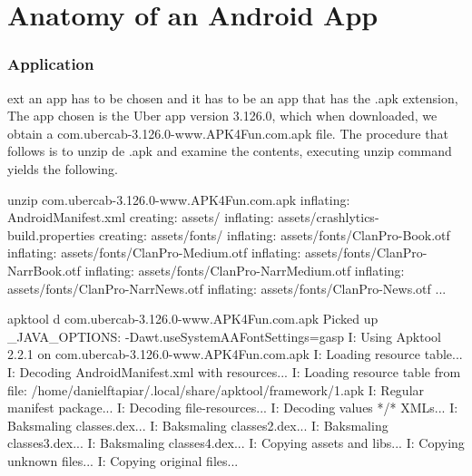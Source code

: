%
%
\let\textcircled=\pgftextcircled
\chapter{Anatomy of an Android App}
\label{chap:anatomyOfAnAndroidApp}
\subsection{Application}

ext an app has to be chosen and it has to be an app that has the .apk extension, The app chosen is the Uber app version 3.126.0, which when downloaded, we obtain a com.ubercab-3.126.0-www.APK4Fun.com.apk file.
The procedure that follows is to unzip de .apk and examine the contents, executing unzip command yields the following.

\begin{commandshell}
unzip com.ubercab-3.126.0-www.APK4Fun.com.apk
inflating: AndroidManifest.xml     
   creating: assets/
  inflating: assets/crashlytics-build.properties  
   creating: assets/fonts/
  inflating: assets/fonts/ClanPro-Book.otf  
  inflating: assets/fonts/ClanPro-Medium.otf  
  inflating: assets/fonts/ClanPro-NarrBook.otf  
  inflating: assets/fonts/ClanPro-NarrMedium.otf  
  inflating: assets/fonts/ClanPro-NarrNews.otf  
  inflating: assets/fonts/ClanPro-News.otf  
...
\end{commandshell}
\begin{commandshell}
apktool d com.ubercab-3.126.0-www.APK4Fun.com.apk 
Picked up _JAVA_OPTIONS:   -Dawt.useSystemAAFontSettings=gasp
I: Using Apktool 2.2.1 on com.ubercab-3.126.0-www.APK4Fun.com.apk
I: Loading resource table...
I: Decoding AndroidManifest.xml with resources...
I: Loading resource table from file: /home/danielftapiar/.local/share/apktool/framework/1.apk
I: Regular manifest package...
I: Decoding file-resources...
I: Decoding values */* XMLs...
I: Baksmaling classes.dex...
I: Baksmaling classes2.dex...
I: Baksmaling classes3.dex...
I: Baksmaling classes4.dex...
I: Copying assets and libs...
I: Copying unknown files...
I: Copying original files...

\end{commandshell}

